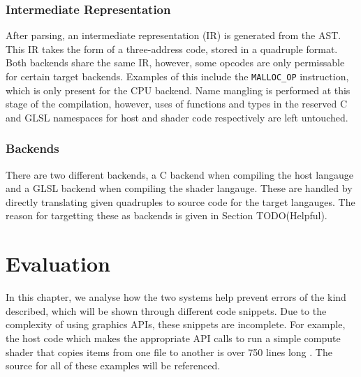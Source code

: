 \documentclass[a4paper,12pt,twoside,openright]{report}
\begin{document}
\subsection{Intermediate Representation}

After parsing, an intermediate representation (IR) is generated from the AST.
This IR takes the form of a three-address code, stored in a quadruple format.
Both backends share the same IR, however, some opcodes are only permissable for
certain target backends. Examples of this include the \texttt{MALLOC\_OP}
instruction, which is only present for the CPU backend. Name mangling is
performed at this stage of the compilation, however, uses of functions and
types in the reserved C and GLSL namespaces for host and shader code
respectively are left untouched.

\subsection{Backends}

There are two different backends, a C backend when compiling the host langauge
and a GLSL backend when compiling the shader langauge. These are handled by
directly translating given quadruples to source code for the target langauges.
The reason for targetting these as backends is given in Section TODO(Helpful).




\chapter{Evaluation}


In this chapter, we analyse how the two systems help prevent errors of the kind
described, which will be shown through different code snippets. Due to the
complexity of using graphics APIs, these snippets are incomplete. For example,
the host code which makes the appropriate API calls to run a simple compute
shader that copies items from one file to another is over 750 lines long
\cite{TODO}. The source for all of these examples will be referenced.
\end{document}
